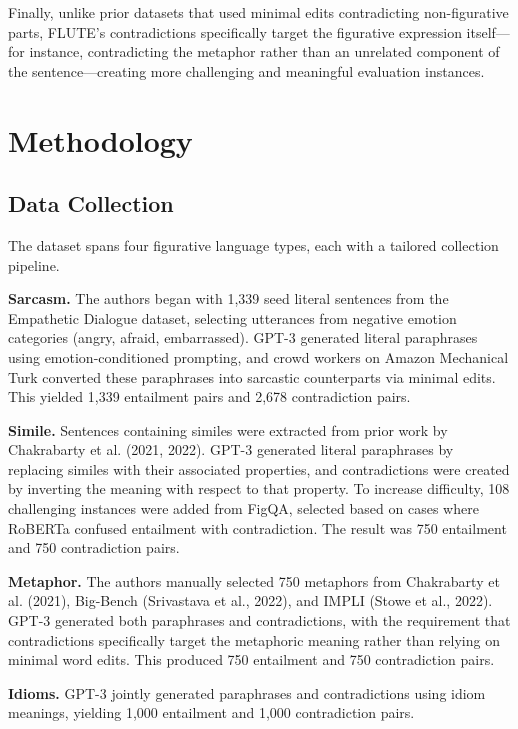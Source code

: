 \documentclass[12pt]{article}
\begin{document}
Finally, unlike prior datasets that used minimal edits contradicting non-figurative parts, FLUTE's contradictions specifically target the figurative expression itself---for instance, contradicting the metaphor rather than an unrelated component of the sentence---creating more challenging and meaningful evaluation instances.

\section{Methodology}

\subsection{Data Collection}

The dataset spans four figurative language types, each with a tailored collection pipeline.

\textbf{Sarcasm.} The authors began with 1,339 seed literal sentences from the Empathetic Dialogue dataset, selecting utterances from negative emotion categories (angry, afraid, embarrassed). GPT-3 generated literal paraphrases using emotion-conditioned prompting, and crowd workers on Amazon Mechanical Turk converted these paraphrases into sarcastic counterparts via minimal edits. This yielded 1,339 entailment pairs and 2,678 contradiction pairs.

\textbf{Simile.} Sentences containing similes were extracted from prior work by Chakrabarty et al. (2021, 2022). GPT-3 generated literal paraphrases by replacing similes with their associated properties, and contradictions were created by inverting the meaning with respect to that property. To increase difficulty, 108 challenging instances were added from FigQA, selected based on cases where RoBERTa confused entailment with contradiction. The result was 750 entailment and 750 contradiction pairs.

\textbf{Metaphor.} The authors manually selected 750 metaphors from Chakrabarty et al. (2021), Big-Bench (Srivastava et al., 2022), and IMPLI (Stowe et al., 2022). GPT-3 generated both paraphrases and contradictions, with the requirement that contradictions specifically target the metaphoric meaning rather than relying on minimal word edits. This produced 750 entailment and 750 contradiction pairs.

\textbf{Idioms.} GPT-3 jointly generated paraphrases and contradictions using idiom meanings, yielding 1,000 entailment and 1,000 contradiction pairs.
\end{document}
